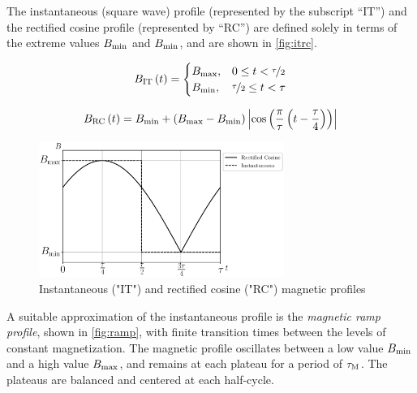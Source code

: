 \documentclass[referee]{svjour3}
\begin{document}


The instantaneous (square wave) profile (represented by the subscript ``IT'') and the rectified cosine profile (represented by ``RC'') are defined solely in terms of the extreme values $B_{\mathrm{min}}$ and $B_{\mathrm{min}}$, and are shown in \autoref{fig:itrc}.


\begin{equation}
{B}_{\mathrm{IT}}\,(t)=
\begin{cases}
{B}_{\mathrm{max}}, & 0 \le t < \nicefrac{\tau}{2} \\
{B}_{\mathrm{min}}, & \nicefrac{\tau}{2} \le t < \tau\\
\end{cases}
\label{eq:199}
\end{equation}

\begin{equation}
{B}_{\mathrm{RC}}\,(t) = B_{\mathrm{min}} + \left(B_{\mathrm{max}} - B_{\mathrm{min}}\right)  \left\lvert \cos\left( \frac{\pi}{\tau} \left( t - \frac{\tau}{4}\right)\right) \right\rvert
\label{eq:200}
\end{equation}

\begin{figure}[!ht]
  \centering
  \includegraphics[width=8cm]{Fig3-profiles_it_and_rc}
  \caption{Instantaneous ("IT") and rectified cosine ("RC") magnetic profiles}
  \label{fig:itrc}
\end{figure}

A suitable approximation of the instantaneous profile is the \emph{magnetic ramp profile}, shown in \autoref{fig:ramp}, with finite transition times between the levels of constant magnetization. The magnetic profile oscillates  between a low value \({B}_{\mathrm{min}}\) and a high value \({B}_{\mathrm{max}}\), and remains at each plateau for a period of \(\tau_{\mathrm{M}}\). The plateaus are balanced and centered at each half-cycle.
\end{document}
